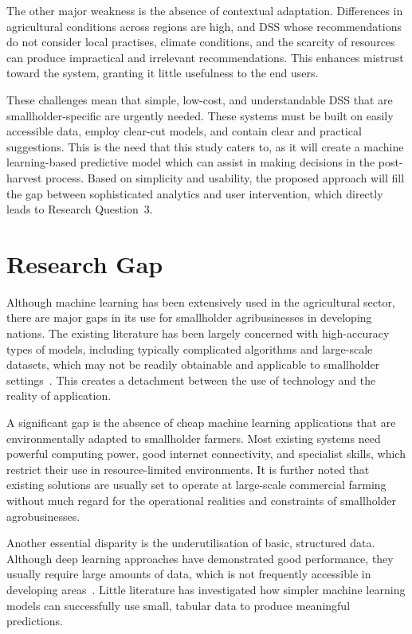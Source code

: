 The other major weakness is the absence of contextual adaptation. Differences in agricultural
conditions across regions are high, and DSS whose recommendations do not consider local practises,
climate conditions, and the scarcity of resources can produce impractical and irrelevant
recommendations. This enhances mistrust toward the system, granting it little usefulness to the
end users.

These challenges mean that simple, low-cost, and understandable DSS that are smallholder-specific
are urgently needed. These systems must be built on easily accessible data, employ clear-cut models,
and contain clear and practical suggestions. This is the need that this study caters to, as it will
create a machine learning-based predictive model which can assist in making decisions in the
post-harvest process. Based on simplicity and usability, the proposed approach will fill the gap
between sophisticated analytics and user intervention, which directly leads to Research Question~3.


\section{Research Gap}

Although machine learning has been extensively used in the agricultural sector, there are major gaps
in its use for smallholder agribusinesses in developing nations. The existing literature has been
largely concerned with high-accuracy types of models, including typically complicated algorithms and
large-scale datasets, which may not be readily obtainable and applicable to smallholder
settings~\cite{jabed2024crop}. This creates a detachment between the use of technology and the
reality of application.

A significant gap is the absence of cheap machine learning applications that are environmentally
adapted to smallholder farmers. Most existing systems need powerful computing power, good internet
connectivity, and specialist skills, which restrict their use in resource-limited environments. It
is further noted that existing solutions are usually set to operate at large-scale commercial
farming without much regard for the operational realities and constraints of smallholder
agrobusinesses.

Another essential disparity is the underutilisation of basic, structured data. Although deep
learning approaches have demonstrated good performance, they usually require large amounts of data,
which is not frequently accessible in developing areas~\cite{meghraoui2024applied}. Little
literature has investigated how simpler machine learning models can successfully use small, tabular
data to produce meaningful predictions.

